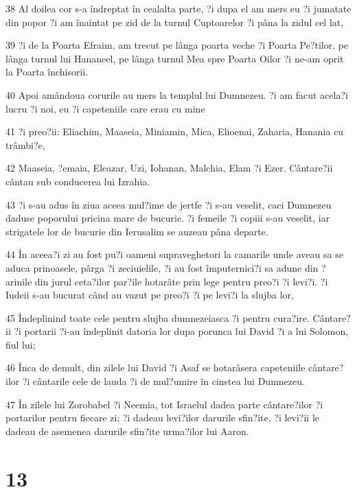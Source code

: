 \par 38 Al doilea cor s-a îndreptat în cealalta parte, ?i dupa el am mers eu ?i jumatate din popor ?i am înaintat pe zid de la turnul Cuptoarelor ?i pâna la zidul cel lat,
\par 39 ?i de la Poarta Efraim, am trecut pe lânga poarta veche ?i Poarta Pe?tilor, pe lânga turnul lui Hananeel, pe lânga turnul Mea spre Poarta Oilor ?i ne-am oprit la Poarta închisorii.
\par 40 Apoi amândoua corurile au mers la templul lui Dumnezeu. ?i am facut acela?i lucru ?i noi, eu ?i capeteniile care erau cu mine
\par 41 ?i preo?ii: Eliachim, Maaseia, Miniamin, Mica, Elioenai, Zaharia, Hanania cu trâmbi?e,
\par 42 Maaseia, ?emaia, Eleazar, Uzi, Iohanan, Malchia, Elam ?i Ezer. Cântare?ii cântau sub conducerea lui Izrahia.
\par 43 ?i s-au adus în ziua aceea mul?ime de jertfe ?i s-au veselit, caci Dumnezeu daduse poporului pricina mare de bucurie. ?i femeile ?i copiii s-au veselit, iar strigatele lor de bucurie din Ierusalim se auzeau pâna departe.
\par 44 În aceea?i zi au fost pu?i oameni supraveghetori la camarile unde aveau sa se aduca prinoasele, pârga ?i zeciuielile, ?i au fost împuternici?i sa adune din ?arinile din jurul ceta?ilor par?ile hotarâte prin lege pentru preo?i ?i levi?i. ?i Iudeii s-au bucurat când au vazut pe preo?i ?i pe levi?i la slujba lor,
\par 45 Îndeplinind toate cele pentru slujba dumnezeiasca ?i pentru cura?ire. Cântare?ii ?i portarii ?i-au îndeplinit datoria lor dupa porunca lui David ?i a lui Solomon, fiul lui;
\par 46 Înca de demult, din zilele lui David ?i Asaf se hotarâsera capeteniile cântare?ilor ?i cântarile cele de lauda ?i de mul?umire în cinstea lui Dumnezeu.
\par 47 În zilele lui Zorobabel ?i Neemia, tot Israelul dadea parte cântare?ilor ?i portarilor pentru fiecare zi; ?i dadeau levi?ilor darurile sfin?ite, ?i levi?ii le dadeau de asemenea darurile sfin?ite urma?ilor lui Aaron.

\chapter{13}

